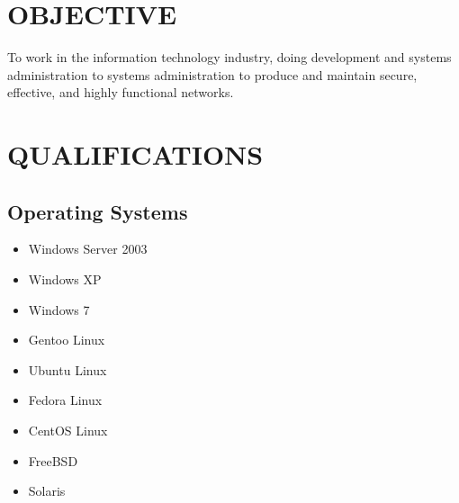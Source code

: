 \documentclass{res}
\begin{document}
 


\address{\bf  ADDRESS\\
    2130 S.W. Camelot Court \#11\\
    Portland, Oregon, 97225\\
    (208) - 860 - 8702\\
}

\begin{resume}

\vspace{-0.2in}	

\section{OBJECTIVE}          
To work in the information technology industry, doing development and systems
administration to systems administration to produce and maintain secure,
effective, and highly functional networks.
 
\vspace{-0.1in}	
\section{QUALIFICATIONS}          
\vspace{-0.2in}	
\subsection{Operating Systems}
\vspace{-0.2in}	
\begin{multicols}{3}
  \begin{itemize}
    \item Windows Server 2003
    \item Windows XP
    \item Windows 7
    \item Gentoo Linux
    \item Ubuntu Linux
    \item Fedora Linux
    \item CentOS Linux
    \item FreeBSD
    \item Solaris
  \end{itemize}
\end{multicols}

\vspace{-0.5in}	

\end{resume}
\end{document}
